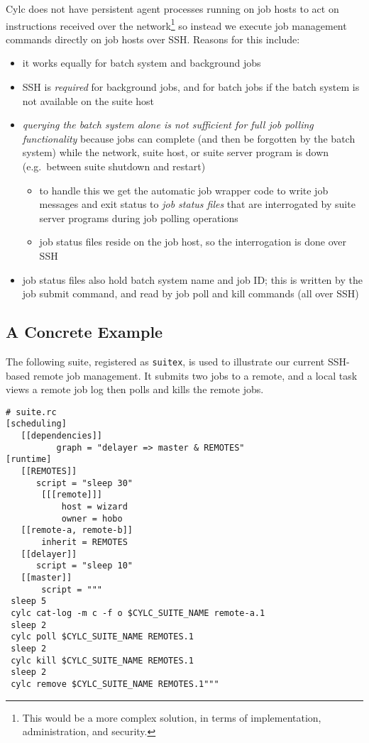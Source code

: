 Cylc does not have persistent agent processes running on job hosts to act on
instructions received over the network\footnote{This would be a more complex
solution, in terms of implementation, administration, and security.} so
instead we execute job management commands directly on job hosts over SSH.
Reasons for this include:
\begin{itemize}
  \item it works equally for batch system and background jobs
  \item SSH is {\em required} for background jobs, and for batch jobs if the
    batch system is not available on the suite host
  \item {\em querying the batch system alone is not sufficient for full job
    polling functionality} because jobs can complete (and then be forgotten by
    the batch system) while the network, suite host, or suite server program is
    down (e.g.\ between suite shutdown and restart)
    \begin{itemize}
      \item to handle this we get the automatic job wrapper code to write
        job messages and exit status to {\em job status files} that are
        interrogated by suite server programs during job polling operations
      \item job status files reside on the job host, so the interrogation
        is done over SSH
    \end{itemize}
  \item job status files also hold batch system name and job ID; this is
    written by the job submit command, and read by job poll and kill commands
    (all over SSH)
\end{itemize}

\subsection{A Concrete Example}

The following suite, registered as \lstinline=suitex=, is used to illustrate
our current SSH-based remote job management. It submits two jobs to a remote,
and a local task views a remote job log then polls and kills the remote jobs.

\lstset{language=suiterc}
\begin{lstlisting}
# suite.rc
[scheduling]
   [[dependencies]]
          graph = "delayer => master & REMOTES"
[runtime]
   [[REMOTES]]
      script = "sleep 30"
       [[[remote]]]
           host = wizard
           owner = hobo
   [[remote-a, remote-b]]
       inherit = REMOTES
   [[delayer]]
      script = "sleep 10"
   [[master]]
       script = """
 sleep 5
 cylc cat-log -m c -f o $CYLC_SUITE_NAME remote-a.1
 sleep 2
 cylc poll $CYLC_SUITE_NAME REMOTES.1
 sleep 2
 cylc kill $CYLC_SUITE_NAME REMOTES.1
 sleep 2
 cylc remove $CYLC_SUITE_NAME REMOTES.1"""
\end{lstlisting}

